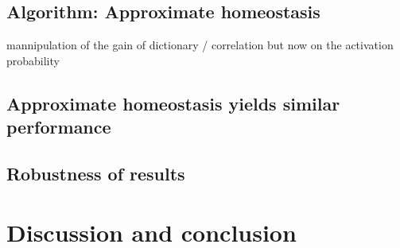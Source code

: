 \documentclass[a4paper, 11pt, draft]{article} %
\begin{document}
\subsection{Algorithm: Approximate homeostasis}\label{HAP}

mannipulation of the gain of dictionary / correlation but now on the activation probability


\subsection{Approximate homeostasis yields similar performance}



\subsection{Robustness of results}




\section{Discussion and conclusion}\label{discussion-et-conclusion}


\end{document}
